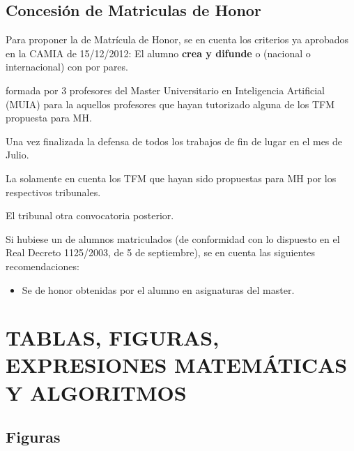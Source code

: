 {{\subsection{Concesión de Matriculas de Honor}
\noindent Para proponer la de Matrícula de Honor, se en cuenta los criterios ya aprobados en la CAMIA de 15/12/2012: El alumno {\bf crea y difunde}  o  (nacional o internacional) con por pares.

formada por 3 profesores del Master Universitario en Inteligencia Artificial (MUIA) para la aquellos profesores que hayan tutorizado alguna de los TFM propuesta para MH.

Una vez finalizada la defensa de todos los trabajos de fin de lugar en el mes de Julio.

La solamente en cuenta los TFM que hayan sido propuestas para MH por los respectivos tribunales.

El tribunal otra convocatoria posterior.

Si hubiese un de alumnos matriculados (de conformidad con lo dispuesto en el Real Decreto 1125/2003, de 5 de septiembre), se en cuenta las siguientes recomendaciones:

\begin{itemize}
\item Se de honor obtenidas por el alumno en asignaturas del master.
\end{itemize}


\section{TABLAS, FIGURAS, EXPRESIONES MATEMÁTICAS Y ALGORITMOS}

\subsection{Figuras}

}}
